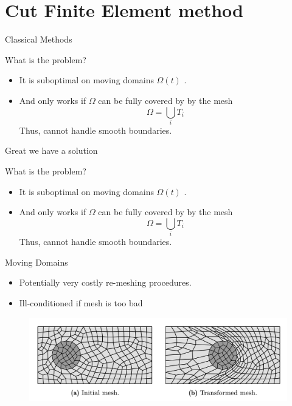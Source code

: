 
\newpage
\section{Cut Finite Element method}%
\label{sec:cut_finite_element_method}

\begin{frame}{Classical Methods}

    \begin{block}{ What is the problem?  }
        \begin{itemize}
            \item It is suboptimal on moving domains $ \Omega ( t)  $ .
            \item And only works if $\Omega $ can be fully covered by by the mesh \[
            \Omega = \bigcup_i T_{i}
            \]
            Thus, cannot handle smooth boundaries.
        \end{itemize}
    \end{block}

\end{frame}

\begin{frame}{Great we have a solution}

    \begin{block}{ What is the problem?  }
        \begin{itemize}
            \item It is suboptimal on moving domains $ \Omega ( t)  $ .
            \item And only works if $\Omega $ can be fully covered by by the mesh \[
            \Omega = \bigcup_i T_{i}
            \]
            Thus, cannot handle smooth boundaries.
        \end{itemize}
    \end{block}
\end{frame}

\begin{frame}{}
    \begin{block}{ Moving Domains }
        \begin{itemize}
            \item Potentially very costly re-meshing procedures.
            \item Ill-conditioned if mesh is too bad
        \end{itemize}
                \begin{figure}
                    \centering
                    \includegraphics[width=0.95 \textwidth]{figures/transformed_mesh.png}
                \end{figure}
    \end{block}
\end{frame}


